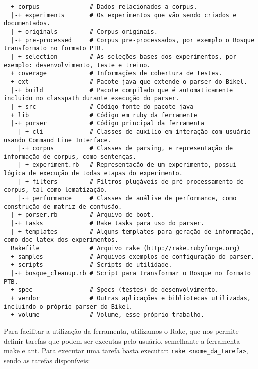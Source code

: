 \scriptsize
\begin{verbatim}
  + corpus              # Dados relacionados a corpus.
  |-+ experiments       # Os experimentos que vão sendo criados e documentados.
  |-+ originals         # Corpus originais.
  |-+ pre-processed     # Corpus pre-processados, por exemplo o Bosque transformato no formato PTB.
  |-+ selection         # As seleções bases dos experimentos, por exemplo: desenvolvimento, teste e treino.
  + coverage            # Informações de cobertura de testes.
  + ext                 # Pacote java que extende o parser do Bikel.
  |-+ build             # Pacote compilado que é automaticamente incluido no classpath durante execução do parser.
  |-+ src               # Código fonte do pacote java
  + lib                 # Código em ruby da ferramente
  |-+ porser            # Código principal da ferramenta
    |-+ cli             # Classes de auxilio em interação com usuário usando Command Line Interface.
    |-+ corpus          # Classes de parsing, e representação de informação de corpus, como sentenças.
    |-+ experiment.rb   # Representação de um experimento, possui lógica de execução de todas etapas do experimento.
    |-+ filters         # Filtros plugáveis de pré-processamento de corpus, tal como lematização.
    |-+ performance     # Classes de análise de performance, como construção de matriz de confusão.
  |-+ porser.rb         # Arquivo de boot.
  |-+ tasks             # Rake tasks para uso do parser.
  |-+ templates         # Alguns templates para geração de informação, como doc latex dos experimentos.
  Rakefile              # Arquivo rake (http://rake.rubyforge.org)
  + samples             # Arquivos exemplos de configuração do parser.
  + scripts             # Scripts de utilidade.
  |-+ bosque_cleanup.rb # Script para transformar o Bosque no formato PTB.
  + spec                # Specs (testes) de desenvolvimento.
  + vendor              # Outras aplicações e bibliotecas utilizadas, incluindo o próprio parser do Bikel.
  + volume              # Volume, esse próprio trabalho.
\end{verbatim}
\normalsize

Para facilitar a utilização da ferramenta, utilizamos o Rake, que nos permite definir tarefas que podem ser executas pelo usuário, semelhante a ferramenta make e ant. Para executar uma tarefa basta executar: \verb|rake <nome_da_tarefa>|, sendo as tarefas disponíveis:

